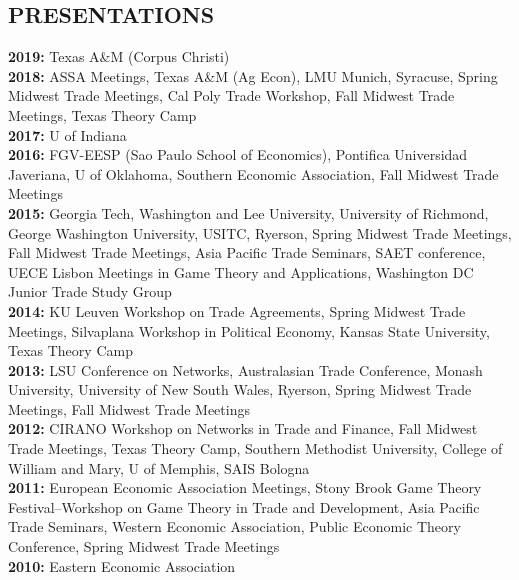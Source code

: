 \documentclass[11pt]{res}
\begin{document}
\begin{resume}
\section{PRESENTATIONS}\vspace{1.5mm}
{\bf 2019:} Texas A\&M (Corpus Christi)\vspace{1.5mm}\\
{\bf 2018:} ASSA Meetings, Texas A\&M (Ag Econ), LMU Munich, Syracuse, Spring Midwest Trade Meetings, Cal Poly Trade Workshop, Fall Midwest Trade Meetings, Texas Theory Camp \vspace{1.5mm}\\
{\bf 2017:} U of Indiana \vspace{1.5mm}\\
{\bf 2016:} FGV-EESP (Sao Paulo School of Economics), Pontifica Universidad Javeriana, U of Oklahoma, Southern Economic Association, Fall Midwest Trade Meetings\vspace{1.5mm}\\
{\bf 2015:} Georgia Tech, Washington and Lee University, University of Richmond, George Washington University, USITC, Ryerson, Spring Midwest Trade Meetings, Fall Midwest Trade Meetings, Asia Pacific Trade Seminars, SAET conference, UECE Lisbon Meetings in Game Theory and Applications, Washington DC Junior Trade Study Group\vspace{1.5mm}\\
{\bf 2014:} KU Leuven Workshop on Trade Agreements, Spring Midwest Trade Meetings, Silvaplana Workshop in Political Economy, Kansas State University, Texas Theory Camp\vspace{1.5mm}\\
{\bf 2013:} LSU Conference on Networks, Australasian Trade Conference, Monash University, University of New South Wales, Ryerson, Spring Midwest Trade Meetings, Fall Midwest Trade Meetings \vspace{1.5mm}\\
{\bf 2012:}  CIRANO Workshop on Networks in Trade and Finance, Fall Midwest Trade Meetings, Texas Theory Camp, Southern Methodist University, College of William and Mary, U of Memphis, SAIS Bologna\vspace{1.5mm}\\
{\bf 2011:} European Economic Association Meetings, Stony Brook Game Theory Festival--Workshop on Game Theory in Trade and Development, Asia Pacific Trade Seminars, Western Economic Association, Public Economic Theory Conference, Spring Midwest Trade Meetings\vspace{1.5mm}\\
{\bf 2010:} Eastern Economic Association


\end{resume}
\end{document}
